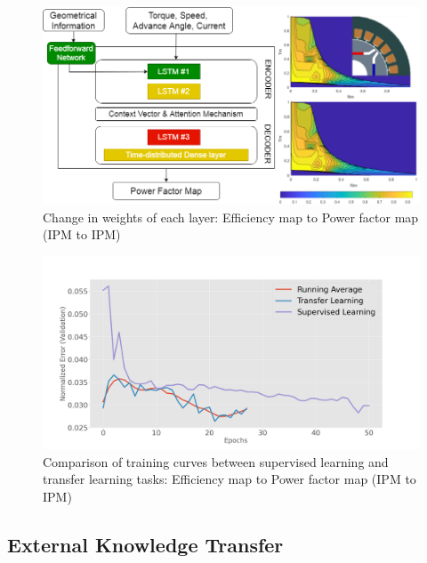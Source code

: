 \begin{figure}[h!]
    \centering
    \includegraphics[width=\textwidth]{Figures/Chp_RNN/Fig_4a.png}
    \caption{Change in weights of each layer: Efficiency map to Power factor map (IPM to IPM)}
    \label{fig:RNN_Fig4a}
\end{figure}

\begin{figure}[h!]
    \centering
    \includegraphics[width=\textwidth]{Figures/Chp_RNN/Fig_5a.png}
    \caption{Comparison of training curves between supervised learning and transfer learning tasks: Efficiency map to Power factor map (IPM to IPM)}
    \label{fig:RNN_Fig5a}
\end{figure}

\subsection{External Knowledge Transfer}\label{RNN:9_Results_TL_External}

